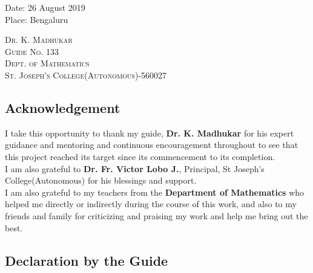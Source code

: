 \documentclass[12pt]{article}
\begin{document}
\begin{flushleft}
Date: 26 August 2019\\
Place: Bengaluru
\end{flushleft}
\vspace{10mm}
\begin{flushright}
\textsc{Dr. K. Madhukar\\ Guide No. 133\\Dept. of Mathematics\\ St. Joseph's College(Autonomous)-560027}
\end{flushright}



\cleardoublepage


\begin{center}
\section*{Acknowledgement}
\end{center}



\begin{center}
\vspace{50mm}
I take this opportunity to thank my guide, \textbf{Dr. K. Madhukar} for his expert guidance and mentoring and continuous encouragement throughout to see that this project reached its target since its commencement to its completion.\\
\vspace{10mm}
I am also grateful to \textbf{Dr. Fr. Victor Lobo J.},
Principal, St Joseph's College(Autonomous) for his blessings and support. \\
\vspace{10mm}
I am also grateful to my teachers from the \textbf{Department of Mathematics} who helped me directly or indirectly during the
course of this work, and also to my friends and family for criticizing and praising my work and help me bring out the best. 

\end{center}

\cleardoublepage

\begin{center}
\section*{Declaration by the Guide}
\end{center}
\end{document}
